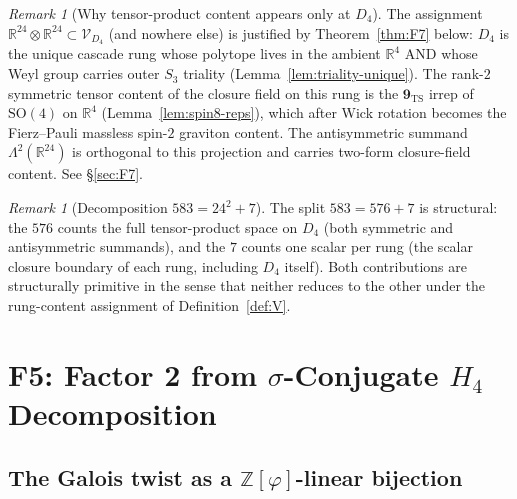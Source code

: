 \documentclass[12pt]{article}
\theoremstyle{definition}
\theoremstyle{remark}
\newtheorem{remark}[theorem]{Remark}
\newcommand{\Vcal}{\mathcal{V}}
\newcommand{\Zphi}{\mathbb{Z}[\varphi]}
\begin{document}
\begin{remark}[Why tensor-product content appears only at $D_4$]\label{rem:rank2-D4}
The assignment $\mathbb{R}^{24} \otimes \mathbb{R}^{24} \subset \Vcal_{D_4}$ (and nowhere else) is justified by Theorem~\ref{thm:F7} below: $D_4$ is the unique cascade rung whose polytope lives in the ambient $\mathbb{R}^4$ AND whose Weyl group carries outer $S_3$ triality (Lemma~\ref{lem:triality-unique}). The rank-$2$ symmetric tensor content of the closure field on this rung is the $\mathbf{9}_{\mathrm{TS}}$ irrep of $\mathrm{SO}(4)$ on $\mathbb{R}^4$ (Lemma~\ref{lem:spin8-reps}), which after Wick rotation becomes the Fierz--Pauli massless spin-$2$ graviton content. The antisymmetric summand $\Lambda^2(\mathbb{R}^{24})$ is orthogonal to this projection and carries two-form closure-field content. See \S\ref{sec:F7}.
\end{remark}

\begin{remark}[Decomposition $583 = 24^2 + 7$]
The split $583 = 576 + 7$ is structural: the $576$ counts the full tensor-product space on $D_4$ (both symmetric and antisymmetric summands), and the $7$ counts one scalar per rung (the scalar closure boundary of each rung, including $D_4$ itself). Both contributions are structurally primitive in the sense that neither reduces to the other under the rung-content assignment of Definition~\ref{def:V}.
\end{remark}

\section{F5: Factor 2 from $\sigma$-Conjugate $H_4$ Decomposition}\label{sec:F5}

\subsection{The Galois twist as a $\Zphi$-linear bijection}
\end{document}
